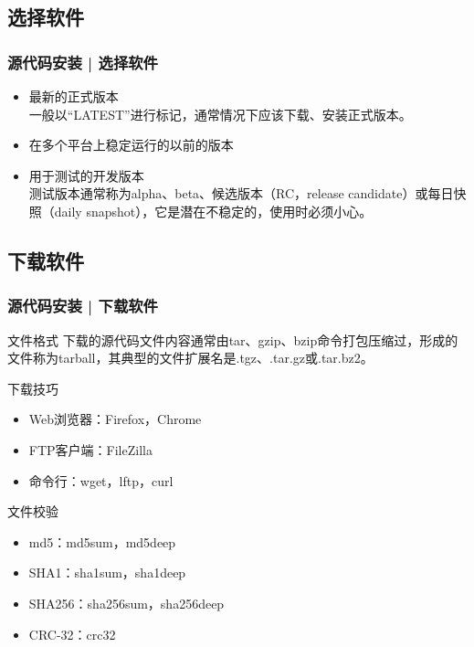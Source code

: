 \subsection{选择软件}
\begin{frame}
  \frametitle{源代码安装 | 选择软件}
  \begin{itemize}
    \item 最新的正式版本\\
      一般以“LATEST”进行标记，通常情况下应该下载、安装正式版本。
    \item 在多个平台上稳定运行的以前的版本
    \item 用于测试的开发版本\\
      测试版本通常称为alpha、beta、候选版本（RC，release candidate）或每日快照（daily snapshot），它是潜在不稳定的，使用时必须小心。
  \end{itemize}
\end{frame}

\subsection{下载软件}
\begin{frame}
  \frametitle{源代码安装 | 下载软件}
  \begin{block}{文件格式}
    下载的源代码文件内容通常由tar、gzip、bzip命令打包压缩过，形成的文件称为tarball，其典型的文件扩展名是.tgz、.tar.gz或.tar.bz2。
  \end{block}
  \pause
  \begin{block}{下载技巧}
    \begin{itemize}
      \item Web浏览器：Firefox，Chrome
      \item FTP客户端：FileZilla
      \item 命令行：wget，lftp，curl
    \end{itemize}
  \end{block}
  \pause
  \begin{block}{文件校验}
    \begin{itemize}
      \item md5：md5sum，md5deep
      \item SHA1：sha1sum，sha1deep
      \item SHA256：sha256sum，sha256deep
      \item CRC-32：crc32
    \end{itemize}
  \end{block}
\end{frame}

